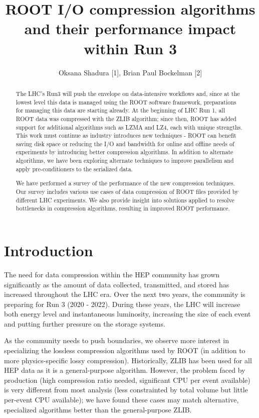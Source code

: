 \documentclass[12pt]{iopart}
\begin{document}
\title{ROOT I/O compression algorithms and their performance impact within Run 3}

\author{Oksana Shadura [1], Brian Paul Bockelman  [2]}
\address{[1] University of Nebraska-Lincoln, USA, [2] Morgridge Institute for Research, USA}
\vspace{10pt}

\begin{abstract}

The LHC’s Run3 will push the envelope on data-intensive workflows and, since at the lowest level this data is managed using the ROOT software framework, preparations for managing this data are starting already. At the beginning of LHC Run 1, all ROOT data was compressed with the ZLIB algorithm; since then, ROOT has added support for additional algorithms such as LZMA and LZ4, each with unique strengths.   This work must continue as industry introduces new techniques - ROOT can benefit saving disk space or reducing the I/O and bandwidth for online and offline needs of experiments by introducing better compression algorithms. In addition to alternate algorithms, we have been exploring alternate techniques to improve parallelism and apply pre-conditioners to the serialized data.

We have performed a survey of the performance of the new compression techniques. Our survey includes various use cases of data compression of ROOT files provided by different LHC experiments. We also provide insight into solutions applied to resolve bottlenecks in compression algorithms, resulting in  improved ROOT performance.
\end{abstract}

\section{Introduction}

The need for data compression within the HEP community has grown significantly as the amount of data collected, transmitted, and stored has increased throughout the LHC era. Over the next two years, the community is preparing for Run 3 (2020 - 2022).  During these years, the LHC will increase both energy level and instantaneous luminosity, increasing the size of each event and putting further pressure on the storage systems.

As the community needs to push boundaries, we observe more interest in specializing the lossless compression algorithms used by ROOT \cite{root} (in addition to more physics-specific lossy compression).  Historically, ZLIB has been used for all HEP data as it is a general-purpose algorithm.  However, the problem faced by production (high compression ratio needed, significant CPU per event available) is very different from most analysis (less constrainted by total volume but little per-event CPU available); we have found these cases may match alternative, specialized algorithms better than the general-purpose ZLIB.
\end{document}
